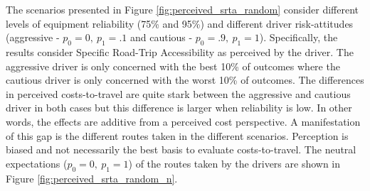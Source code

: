 \documentclass[11pt]{article}
\begin{document}
\begin{multicols}{2}
The scenarios presented in Figure \ref{fig:perceived_srta_random} consider different levels of equipment reliability (75\% and 95\%) and different driver risk-attitudes (aggressive - $p_0 = 0,\ p_1 = .1$ and cautious - $p_0 = .9,\ p_1 = 1$). Specifically, the results consider Specific Road-Trip Accessibility as perceived by the driver. The aggressive driver is only concerned with the best 10\% of outcomes where the cautious driver is only concerned with the worst 10\% of outcomes. The differences in perceived costs-to-travel are quite stark between the aggressive and cautious driver in both cases but this difference is larger when reliability is low. In other words, the effects are additive from a perceived cost perspective. A manifestation of this gap is the different routes taken in the different scenarios. Perception is biased and not necessarily the best basis to evaluate costs-to-travel. The neutral expectations ($p_0 = 0,\ p_1 = 1$) of the routes taken by the drivers are shown in Figure \ref{fig:perceived_srta_random_n}.


\end{multicols}
\end{document}
